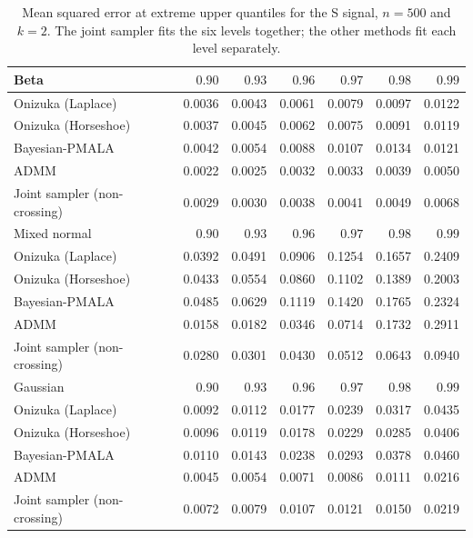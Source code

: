 \begin{table}[!htbp]
\centering
\small
\caption{Mean squared error at extreme upper quantiles for the S signal, $n=500$ and $k=2$. The joint sampler fits the six levels together; the other methods fit each level separately.}
\label{tab:s_ext_upper_mse}
\begin{tabular}{lrrrrrr}
\toprule
Beta & $0.90$ & $0.93$ & $0.96$ & $0.97$ & $0.98$ & $0.99$ \\
\midrule
Onizuka (Laplace) & 0.0036 & 0.0043 & 0.0061 & 0.0079 & 0.0097 & 0.0122 \\
Onizuka (Horseshoe) & 0.0037 & 0.0045 & 0.0062 & 0.0075 & 0.0091 & 0.0119 \\
Bayesian-PMALA & 0.0042 & 0.0054 & 0.0088 & 0.0107 & 0.0134 & 0.0121 \\
ADMM & 0.0022 & 0.0025 & 0.0032 & 0.0033 & 0.0039 & 0.0050 \\
Joint sampler (non-crossing) & 0.0029 & 0.0030 & 0.0038 & 0.0041 & 0.0049 & 0.0068 \\
\midrule
Mixed normal & $0.90$ & $0.93$ & $0.96$ & $0.97$ & $0.98$ & $0.99$ \\
\midrule
Onizuka (Laplace) & 0.0392 & 0.0491 & 0.0906 & 0.1254 & 0.1657 & 0.2409 \\
Onizuka (Horseshoe) & 0.0433 & 0.0554 & 0.0860 & 0.1102 & 0.1389 & 0.2003 \\
Bayesian-PMALA & 0.0485 & 0.0629 & 0.1119 & 0.1420 & 0.1765 & 0.2324 \\
ADMM & 0.0158 & 0.0182 & 0.0346 & 0.0714 & 0.1732 & 0.2911 \\
Joint sampler (non-crossing) & 0.0280 & 0.0301 & 0.0430 & 0.0512 & 0.0643 & 0.0940 \\
\midrule
Gaussian & $0.90$ & $0.93$ & $0.96$ & $0.97$ & $0.98$ & $0.99$ \\
\midrule
Onizuka (Laplace) & 0.0092 & 0.0112 & 0.0177 & 0.0239 & 0.0317 & 0.0435 \\
Onizuka (Horseshoe) & 0.0096 & 0.0119 & 0.0178 & 0.0229 & 0.0285 & 0.0406 \\
Bayesian-PMALA & 0.0110 & 0.0143 & 0.0238 & 0.0293 & 0.0378 & 0.0460 \\
ADMM & 0.0045 & 0.0054 & 0.0071 & 0.0086 & 0.0111 & 0.0216 \\
Joint sampler (non-crossing) & 0.0072 & 0.0079 & 0.0107 & 0.0121 & 0.0150 & 0.0219 \\
\bottomrule
\end{tabular}
\end{table}

